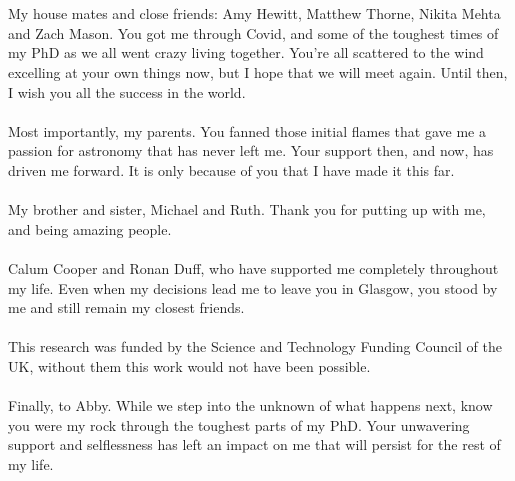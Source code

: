 \begin{acknowledgements}
\\
\\
My house mates and close friends: Amy Hewitt, Matthew Thorne, Nikita Mehta and Zach Mason. You got me through Covid, and some of the toughest times of my PhD as we all went crazy living together. You're all scattered to the wind excelling at your own things now, but I hope that we will meet again. Until then, I wish you all the success in the world.
\\
\\
Most importantly, my parents. You fanned those initial flames that gave me a passion for astronomy that has never left me. Your support then, and now, has driven me forward. It is only because of you that I have made it this far.
\\
\\
My brother and sister, Michael and Ruth. Thank you for putting up with me, and being amazing people.
\\
\\
Calum Cooper and Ronan Duff, who have supported me completely throughout my life. Even when my decisions lead me to leave you in Glasgow, you stood by me and still remain my closest friends.
\\
\\
This research was funded by the Science and Technology Funding Council of the UK, without them this work would not have been possible.
\\
\\
Finally, to Abby. While we step into the unknown of what happens next, know you were my rock through the toughest parts of my PhD. Your unwavering support and selflessness has left an impact on me that will persist for the rest of my life.

\end{acknowledgements}

